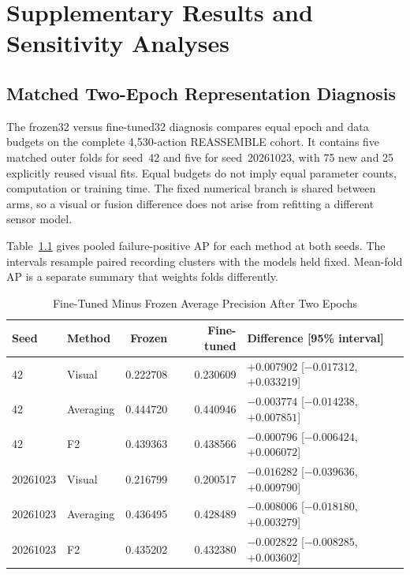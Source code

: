 \chapter{Supplementary Results and Sensitivity Analyses}
\label{app:supplementary-results}

\section{Matched Two-Epoch Representation Diagnosis}
The frozen32 versus fine-tuned32 diagnosis compares equal epoch and data budgets on the complete 4,530-action REASSEMBLE cohort. It contains five matched outer folds for seed~42 and five for seed~20261023, with 75 new and 25 explicitly reused visual fits. Equal budgets do not imply equal parameter counts, computation or training time. The fixed numerical branch is shared between arms, so a visual or fusion difference does not arise from refitting a different sensor model.

Table~\ref{tab:twoepoch-supplement} gives pooled failure-positive AP for each method at both seeds. The intervals resample paired recording clusters with the models held fixed. Mean-fold AP is a separate summary that weights folds differently.

\begin{table}[htbp]
\caption{Fine-Tuned Minus Frozen Average Precision After Two Epochs}\label{tab:twoepoch-supplement}
\centering\small

\begin{tabular}{llrrl}\hline
Seed & Method & Frozen & Fine-tuned & Difference [95\% interval]\\\hline
42 & Visual &0.222708&0.230609&+0.007902 [$-0.017312$, $+0.033219$]\\
42 & Averaging &0.444720&0.440946&$-0.003774$ [$-0.014238$, $+0.007851$]\\
42 & F2 &0.439363&0.438566&$-0.000796$ [$-0.006424$, $+0.006072$]\\
20261023 & Visual &0.216799&0.200517&$-0.016282$ [$-0.039636$, $+0.009790$]\\
20261023 & Averaging &0.436495&0.428489&$-0.008006$ [$-0.018180$, $+0.003279$]\\
20261023 & F2 &0.435202&0.432380&$-0.002822$ [$-0.008285$, $+0.003602$]\\\hline
\end{tabular}
\end{table}

